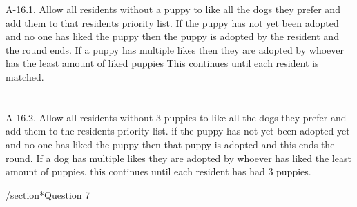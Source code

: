 \documentclass[10pt]{article}
\begin{document}
A-16.1. Allow all residents without a puppy to like all the dogs they prefer and add them to that residents priority list. If the puppy has not yet been adopted and no one has liked the puppy then the puppy is adopted by the resident and the round ends. If a puppy has multiple likes then they are adopted by whoever has the least amount of liked puppies This continues until each resident is matched.
\section*{}

A-16.2. Allow all residents without 3 puppies to like all the dogs they prefer and add them to the residents priority list. if the puppy has not yet been adopted yet and no one has liked the puppy then that puppy is adopted and this ends the round. If a dog has multiple likes they are adopted by whoever has liked the least amount of puppies. this continues until each resident has had 3 puppies.

/section*{Question 7}
\end{document}

